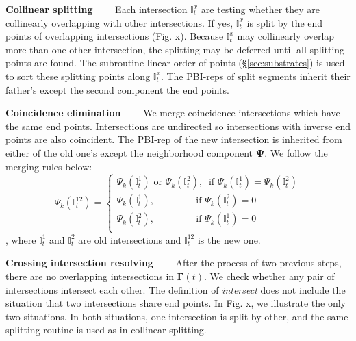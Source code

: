 \documentclass[10pt,journal,compsoc]{IEEEtran}
\begin{document}
\vspace{0.5em}
\noindent \textbf{Collinear splitting}~~~~
Each intersection $\mathbb{I}_{t}^x$ are testing whether they are collinearly overlapping with other intersections. If yes, $\mathbb{I}_{t}^x$ is split by the end points of overlapping intersections (Fig. x). Because $\mathbb{I}_{t}^x$ may collinearly overlap more than one other intersection, the splitting may be deferred until all splitting points are found. The subroutine linear order of points (\S\ref{sec:substrates}) is used to sort these splitting points along $\mathbb{I}_{t}^x$. The PBI-reps of split segments inherit their father's except the second component the end points.

\vspace{0.5em}
\noindent \textbf{Coincidence elimination}~~~~
We merge coincidence intersections which have the same end points. Intersections are undirected so intersections with inverse end points are also coincident. The PBI-rep of the new intersection is inherited from either of the old one's except the neighborhood component $\bm{\Psi}$. We follow the merging rules below:
\begin{equation}
  \Psi_k(\mathbb{I}_{t}^{12})=\left\{
   \begin{array}{l}
   \Psi_k(\mathbb{I}_{t}^1)\mbox{ or }\Psi_k(\mathbb{I}_{t}^2),\ \mbox{ if } \Psi_k(\mathbb{I}_{t}^1)=\Psi_k(\mathbb{I}_{t}^2) \\
   \Psi_k(\mathbb{I}_{t}^1),\ \ \ \ \ \ \ \ \ \ \ \ \ \ \ \ \ \ \mbox{ if } \Psi_k(\mathbb{I}_{t}^2)=0  \\
   \Psi_k(\mathbb{I}_{t}^2),\ \ \ \ \ \ \ \ \ \ \ \ \ \ \ \ \ \ \mbox{ if } \Psi_k(\mathbb{I}_{t}^1)=0  \\
   \end{array}
  \right.
\end{equation}
, where $\mathbb{I}_{t}^1$ and $\mathbb{I}_{t}^2$ are old intersections and $\mathbb{I}_{t}^{12}$ is the new one.


\vspace{0.5em}
\noindent \textbf{Crossing intersection resolving}~~~~
After the process of two previous steps, there are no overlapping intersections in $\bm{\Gamma}(t)$. We check whether any pair of intersections intersect each other. The definition of \emph{intersect} does not include the situation that two intersections share end points. In Fig. x, we illustrate the only two situations. In both situations, one intersection is split by other, and the same splitting routine is used as in collinear splitting.
\end{document}
